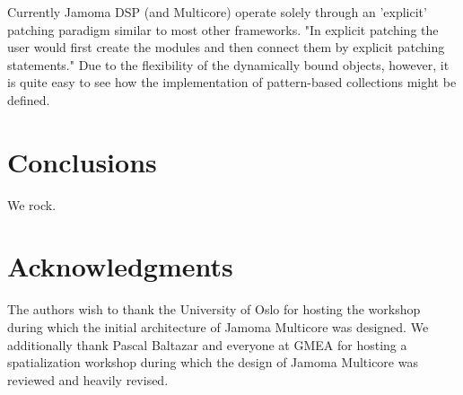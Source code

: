 \documentclass[twoside,a4paper]{article}
\begin{document}
Currently Jamoma DSP (and Multicore) operate solely through an 'explicit' patching paradigm similar to most other frameworks.  "In explicit patching the user would first create the modules and then connect them by explicit patching statements."  Due to the flexibility of the dynamically bound objects, however, it is quite easy to see how the implementation of pattern-based collections might be defined.



\section{Conclusions}
We rock.



\section{Acknowledgments}

The authors wish to thank the University of Oslo for hosting the workshop during which the initial architecture of Jamoma Multicore was designed.  We additionally thank Pascal Baltazar and everyone at GMEA for hosting a spatialization workshop during which the design of Jamoma Multicore was reviewed and heavily revised.




\end{document}
